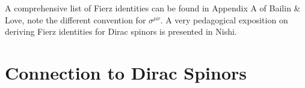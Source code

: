 % 
% 
% 

A comprehensive list of Fierz identities can be found in Appendix A of Bailin \& Love\autocite{Bailin:1994qt}, note the different convention for $\sigma^{\mu\nu}$. A very pedagogical exposition on deriving Fierz identities for Dirac spinors is presented in Nishi\autocite{nishi:1160}. 


\section{Connection to Dirac Spinors}\label{subsec:SUSYalg:DiracSpinors}

